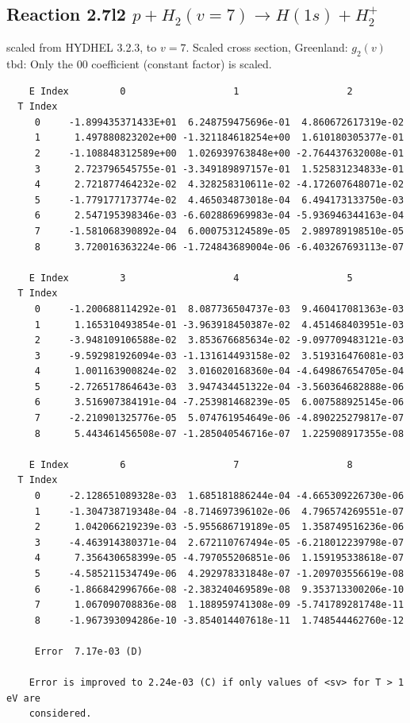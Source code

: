 \documentclass[12pt,dvipdfmx]{article}
\begin{document}
\subsection{
Reaction 2.7l2 $   p + H_2(v=7) \rightarrow H(1s) + H_2^+$}
scaled from HYDHEL 3.2.3, to $v=7$. Scaled cross section, Greenland: $g_2(v)$
tbd:
Only the 00 coefficient (constant factor) is scaled.


\begin{small}\begin{verbatim}
    E Index         0                   1                   2
  T Index
     0     -1.899435371433E+01  6.248759475696e-01  4.860672617319e-02
     1      1.497880823202e+00 -1.321184618254e+00  1.610180305377e-01
     2     -1.108848312589e+00  1.026939763848e+00 -2.764437632008e-01
     3      2.723796545755e-01 -3.349189897157e-01  1.525831234833e-01
     4      2.721877464232e-02  4.328258310611e-02 -4.172607648071e-02
     5     -1.779177173774e-02  4.465034873018e-04  6.494173133750e-03
     6      2.547195398346e-03 -6.602886969983e-04 -5.936946344163e-04
     7     -1.581068390892e-04  6.000753124589e-05  2.989789198510e-05
     8      3.720016363224e-06 -1.724843689004e-06 -6.403267693113e-07

    E Index         3                   4                   5
  T Index
     0     -1.200688114292e-01  8.087736504737e-03  9.460417081363e-03
     1      1.165310493854e-01 -3.963918450387e-02  4.451468403951e-03
     2     -3.948109106588e-02  3.853676685634e-02 -9.097709483121e-03
     3     -9.592981926094e-03 -1.131614493158e-02  3.519316476081e-03
     4      1.001163900824e-02  3.016020168360e-04 -4.649867654705e-04
     5     -2.726517864643e-03  3.947434451322e-04 -3.560364682888e-06
     6      3.516907384191e-04 -7.253981468239e-05  6.007588925145e-06
     7     -2.210901325776e-05  5.074761954649e-06 -4.890225279817e-07
     8      5.443461456508e-07 -1.285040546716e-07  1.225908917355e-08

    E Index         6                   7                   8
  T Index
     0     -2.128651089328e-03  1.685181886244e-04 -4.665309226730e-06
     1     -1.304738719348e-04 -8.714697396102e-06  4.796574269551e-07
     2      1.042066219239e-03 -5.955686719189e-05  1.358749516236e-06
     3     -4.463914380371e-04  2.672110767494e-05 -6.218012239798e-07
     4      7.356430658399e-05 -4.797055206851e-06  1.159195338618e-07
     5     -4.585211534749e-06  4.292978331848e-07 -1.209703556619e-08
     6     -1.866842996766e-08 -2.383240469589e-08  9.353713300206e-10
     7      1.067090708836e-08  1.188959741308e-09 -5.741789281748e-11
     8     -1.967393094286e-10 -3.854014407618e-11  1.748544462760e-12

     Error  7.17e-03 (D)

    Error is improved to 2.24e-03 (C) if only values of <sv> for T > 1 eV are
    considered.
\end{verbatim}\end{small}
\newpage
\end{document}
